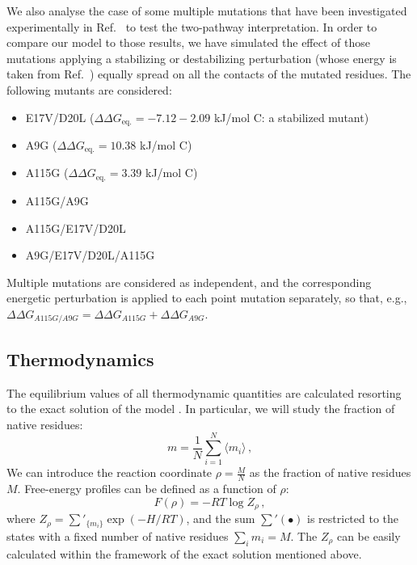 We also analyse the case of some multiple mutations that have been investigated
experimentally in Ref.~\cite{Lowe2007} to test the two-pathway interpretation.
In order to compare our model to those results, we have simulated the effect of
those mutations applying a stabilizing or destabilizing perturbation (whose
energy is taken from Ref.~\cite{Lowe2007}) equally spread on
all the contacts of the mutated residues. The following
mutants are considered:
\begin{itemize}
\item E17V/D20L ($\Delta\Delta G_\textrm{eq.}= -7.12 - 2.09$ kJ/mol C: a stabilized mutant)
\item A9G ($\Delta\Delta G_\textrm{eq.}= 10.38$ kJ/mol C)
\item A115G ($\Delta\Delta G_\textrm{eq.}= 3.39$ kJ/mol C)
\item A115G/A9G
\item A115G/E17V/D20L
\item A9G/E17V/D20L/A115G
\end{itemize}

Multiple mutations are considered as independent, and the corresponding
energetic perturbation is applied to each point mutation separately, so that,
e.g., $\Delta \Delta G_{A115G/A9G}= \Delta \Delta G_{A115G} + \Delta \Delta
G_{A9G}$.

\subsection{Thermodynamics}
The equilibrium values of all thermodynamic quantities  are calculated resorting
to the exact solution of the model \cite{Bruscolini2002,Pelizzola2005}. In
particular, we will study the fraction of native residues:
\begin{equation}
m=\frac{1}{N} \sum_{i=1}^{N} \langle m_i \rangle\,,
\label{eq:avenatfrac}%
\end{equation}
We can introduce the reaction coordinate $\rho=\frac M N$ as the fraction of native
residues $M$.
Free-energy profiles can be defined as a function of $\rho$:
\begin{equation}
F(\rho)=-RT \log{Z_\rho}\,,
\label{eq:fprofile} 
\end{equation}
where $Z_\rho=\sum'_{\lbrace m_{i}\rbrace} \exp{(- H/RT)}$, and the sum 
$\sum' (\bullet)$ is
restricted to the states with a fixed number of native residues $\sum_i m_i=M$.
The $Z_\rho$ can be easily calculated within the framework of the exact solution
mentioned above.

